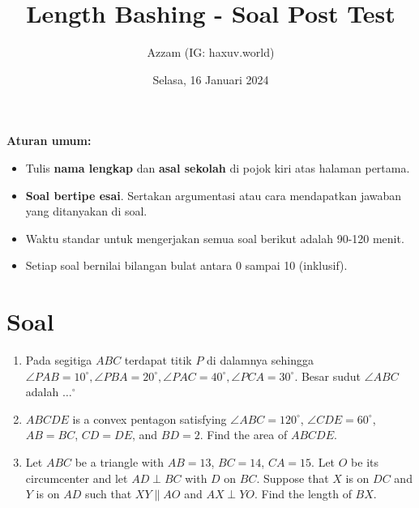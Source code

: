 \documentclass[12pt]{scrartcl}
\title{Length Bashing - Soal Post Test}
\author{Azzam (IG: haxuv.world)}
\date{Selasa, 16 Januari 2024}
\begin{document}
\maketitle

\renewcommand*\contentsname{Daftar Isi}
\tableofcontents

\newpage
\textbf{Aturan umum:}
\begin{itemize}
    \item Tulis \textbf{nama lengkap} dan \textbf{asal sekolah} di pojok kiri atas halaman pertama.
    \item \textbf{Soal bertipe esai}. Sertakan argumentasi atau cara mendapatkan jawaban yang ditanyakan di soal.
    \item Waktu standar untuk mengerjakan semua soal berikut adalah 90-120 menit.
    \item Setiap soal bernilai bilangan bulat antara 0 sampai 10 (inklusif).
\end{itemize}


\section{Soal}
\begin{enumerate}
    \item Pada segitiga $ABC$ terdapat titik $P$ di dalamnya sehingga $\angle PAB = 10^\circ, \angle PBA = 20^\circ , \angle PAC = 40^\circ, \angle PCA = 30^\circ$. Besar sudut $\angle ABC$ adalah $\dots^\circ$ 
    
    \item $ABCDE$ is a convex pentagon satisfying $\angle ABC = 120^\circ$, $\angle CDE = 60^\circ$, $AB = BC$, $CD = DE$, and $BD = 2$. Find the area of $ABCDE$.

    \item Let $ABC$ be a triangle with $AB = 13$, $BC = 14$, $CA = 15$. Let $O$ be its circumcenter and let $AD \perp BC$ with $D$ on $BC$. Suppose that $X$ is on $DC$ and $Y$ is on $AD$ such that $XY \parallel AO$ and $AX \perp YO$. Find the length of $BX$.
\end{enumerate}
\end{document}
